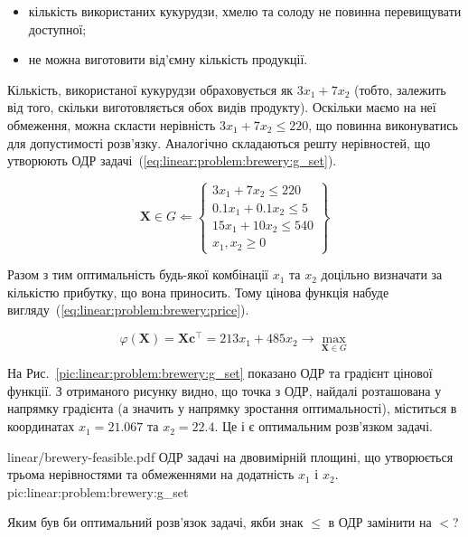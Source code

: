 \documentclass[\main/book.tex]{subfiles}
\begin{document}
\begin{itemize}
 \item кількість використаних кукурудзи, хмелю та солоду не повинна перевищувати доступної;
 \item не можна виготовити від'ємну кількість продукції.
\end{itemize}

Кількість, використаної кукурудзи обраховується як ${3 x_1 + 7 x_2}$ (тобто, залежить від того, скільки виготовляється обох видів продукту). Оскільки маємо на неї обмеження, можна скласти нерівність ${3 x_1 + 7 x_2 \leq 220}$, що повинна виконуватись для допустимості розв'язку. Аналогічно складаються решту нерівностей, що утворюють ОДР задачі~(\ref{eq:linear:problem:brewery:g_set}).

\begin{equation}
 \mathbf{X} \in G \Leftarrow \left\{\begin{array}{l}
    3 x_1 + 7 x_2 \leq 220 \\
    0.1 x_1 + 0.1 x_2 \leq 5 \\
    15 x_1 + 10 x_2 \leq 540 \\
    x_1, x_2 \geq 0
 \end{array}\right\}
 \label{eq:linear:problem:brewery:g_set}
\end{equation}

Разом з тим оптимальність будь-якої комбінації $x_1$ та $x_2$ доцільно визначати за кількістю прибутку, що вона приносить. Тому цінова функція набуде вигляду~(\ref{eq:linear:problem:brewery:price}).

\begin{equation}
 \varphi(\mathbf{X}) =
 \mathbf{X} \mathbf{c}^\top =
 213 x_1 + 485 x_2
 \rightarrow \max_{\mathbf{X} \in G}
 \label{eq:linear:problem:brewery:price}
\end{equation}

На Рис.~\ref{pic:linear:problem:brewery:g_set} показано ОДР та градієнт цінової функції. З отриманого рисунку видно, що точка з ОДР, найдалі розташована у напрямку градієнта (а значить у напрямку зростання оптимальності), міститься в координатах $x_1 = 21.067$ та $x_2 = 22.4$. Це і є оптимальним розв'язком задачі.

\illustration
 {linear/brewery-feasible.pdf}
 {ОДР задачі на двовимірній площині, що утворюється трьома нерівностями та обмеженнями на додатність $x_1$ і $x_2$.}
 {pic:linear:problem:brewery:g_set}
 
\begin{question}
 Яким був би оптимальний розв'язок задачі, якби знак \flqq{}$\leq$\frqq{} в ОДР замінити на \flqq$<$\frqq?
\end{question}
\end{document}
